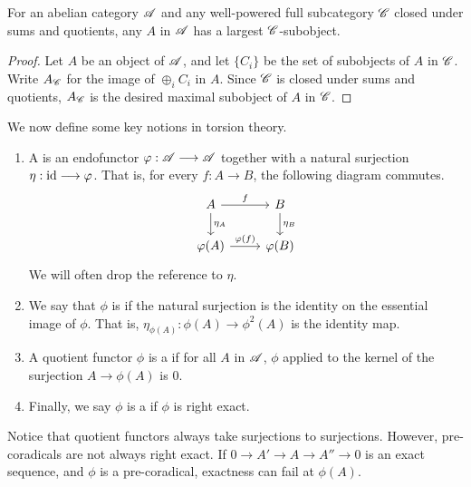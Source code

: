 \begin{prop}\label{prop_max_subobj}
For an abelian category $\mathscr{A}$ and any well-powered full 
subcategory $\mathscr{C}$ closed under sums and quotients, any $A$ in 
$\mathscr{A}$ has a largest $\mathscr{C}$-subobject.
\end{prop}
\begin{proof}
Let $A$ be an object of $\mathscr{A}$, and let $\{C_i\}$ be the set 
of subobjects of $A$ in $\mathscr{C}$. Write $A_{\mathscr{C}}$ for the
image of $\oplus_{i} C_i$ in $A$. Since $\mathscr{C}$ is closed under
sums and quotients, $A_{\mathscr{C}}$ is the desired maximal subobject 
of $A$ in $\mathscr{C}$.
\end{proof}

We now define some key notions in torsion theory.

\begin{defn}\label{def_coradical}
\begin{enumerate}
\item A  is an endofunctor $\varphi : \mathscr{A} 
\longrightarrow \mathscr{A}$ together with a natural surjection $\eta: \mathrm{id} \longrightarrow 
\varphi$. That is, for every $f: A \to B$, the following diagram commutes.
\[
\begin{tikzcd}
A \arrow{r}{f} \arrow{d}{\eta_A} &
B \arrow{d}{\eta_B} \\
\phi(A) \arrow{r}{\phi(f)} 
&\phi(B)
\end{tikzcd}
\]
We will often drop the reference to $\eta$. 

\item We say that $\phi$ is  if the natural 
surjection is the identity on the essential image of $\phi$.
That is, $\eta_{\phi(A)}: \phi(A) \to \phi^2(A)$ is the identity 
map.

\item A quotient functor $\phi$ is a  if for all
$A$ in $\mathscr{A}$, $\phi$ applied to the kernel of the surjection 
$A \to \phi(A)$ is $0$.

\item Finally, we say $\phi$ is a  if $\phi$ is
right exact.
\end{enumerate}
\end{defn}

\begin{rmk}
Notice that quotient functors always take surjections to 
surjections. However, pre-coradicals are not always right exact.
If $0 \to A' \to A \to A'' \to 0$ is an exact sequence, and $\phi$
is a pre-coradical, exactness can fail at $\phi(A)$.
\end{rmk}

